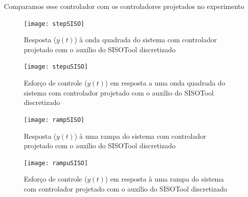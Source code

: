 \documentclass{article}
\begin{document}
Comparamos esse controlador com os controladores projetados no experimento 
\begin{figure}[H]
	\centering
	\texttt{[image: stepSISO]}
	\caption{Resposta ($y(t)$) à onda quadrada do sistema com controlador projetado com o auxílio do SISOTool discretizado}
	\label{fig:stepSISO}
\end{figure}
\begin{figure}[H]
	\centering
	\texttt{[image: stepuSISO]}
	\caption{Esforço de controle ($y(t)$) em resposta a uma onda quadrada do sistema com controlador projetado com o auxílio do SISOTool discretizado}
	\label{fig:stepuSISO}
\end{figure}
\begin{figure}[H]
	\centering
	\texttt{[image: rampSISO]}
	\caption{Resposta ($y(t)$) à uma rampa do sistema com controlador projetado com o auxílio do SISOTool discretizado}
	\label{fig:rampSISO}
\end{figure}
\begin{figure}[H]
	\centering
	\texttt{[image: rampuSISO]}
	\caption{Esforço de controle ($y(t)$) em resposta à uma rampa do sistema com controlador projetado com o auxílio do SISOTool discretizado}
	\label{fig:rampuSISO}
\end{figure}
\begin{thebibliography}{widestlabel}
\end{thebibliography}
\end{document}
